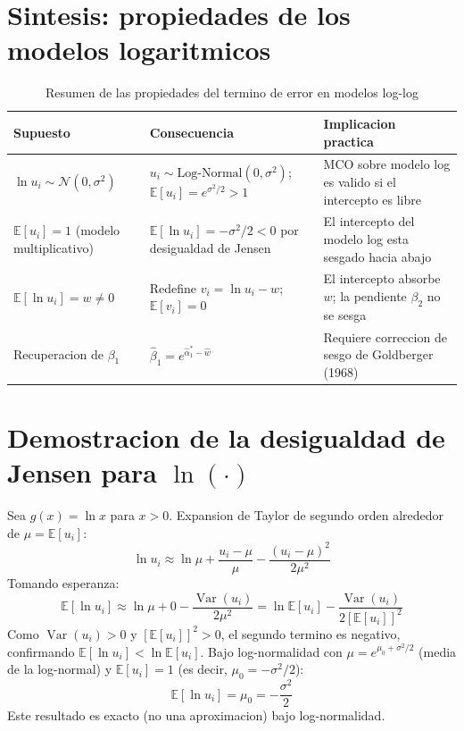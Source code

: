 \documentclass[12pt, letterpaper]{article}
\theoremstyle{remark}
\newcommand{\E}{\mathbb{E}}
\newcommand{\Var}{\operatorname{Var}}
\begin{document}
\section{Sintesis: propiedades de los modelos logaritmicos}

\begin{table}[ht]
\centering
\caption{Resumen de las propiedades del termino de error en modelos log-log}
\label{tab:resumen}
\small
\begin{tabular}{p{4cm} p{5cm} p{4.5cm}}
\toprule
\textbf{Supuesto} & \textbf{Consecuencia} & \textbf{Implicacion practica} \\
\midrule
$\ln u_i \sim \mathcal{N}(0, \sigma^2)$
  & $u_i \sim \text{Log-Normal}(0, \sigma^2)$; $\E[u_i] = e^{\sigma^2/2} > 1$
  & MCO sobre modelo log es valido si el intercepto es libre \\[6pt]
$\E[u_i] = 1$ (modelo multiplicativo)
  & $\E[\ln u_i] = -\sigma^2/2 < 0$ por desigualdad de Jensen
  & El intercepto del modelo log esta sesgado hacia abajo \\[6pt]
$\E[\ln u_i] = w \neq 0$
  & Redefine $v_i = \ln u_i - w$; $\E[v_i] = 0$
  & El intercepto absorbe $w$; la pendiente $\beta_2$ no se sesga \\[6pt]
Recuperacion de $\beta_1$
  & $\hat\beta_1 = e^{\hat\alpha_1^* - \hat w}$
  & Requiere correccion de sesgo de Goldberger (1968) \\
\bottomrule
\end{tabular}
\end{table}

\appendix

\section{Demostracion de la desigualdad de Jensen para $\ln(\cdot)$}

Sea $g(x) = \ln x$ para $x > 0$. Expansion de Taylor de segundo orden alrededor
de $\mu = \E[u_i]$:
\begin{equation}
  \ln u_i \approx \ln\mu + \frac{u_i - \mu}{\mu} - \frac{(u_i - \mu)^2}{2\mu^2}
  \label{eq:taylor_ln}
\end{equation}
Tomando esperanza:
\begin{equation}
  \E[\ln u_i]
    \approx \ln\mu + 0 - \frac{\Var(u_i)}{2\mu^2}
    = \ln\E[u_i] - \frac{\Var(u_i)}{2[\E[u_i]]^2}
  \label{eq:jensen_taylor}
\end{equation}
Como $\Var(u_i) > 0$ y $[\E[u_i]]^2 > 0$, el segundo termino es negativo, confirmando
$\E[\ln u_i] < \ln\E[u_i]$. Bajo log-normalidad con $\mu = e^{\mu_0 + \sigma^2/2}$
(media de la log-normal) y $\E[u_i] = 1$ (es decir, $\mu_0 = -\sigma^2/2$):
\begin{equation}
  \E[\ln u_i] = \mu_0 = -\frac{\sigma^2}{2}
  \label{eq:resultado_exacto}
\end{equation}
Este resultado es exacto (no una aproximacion) bajo log-normalidad.
\end{document}
